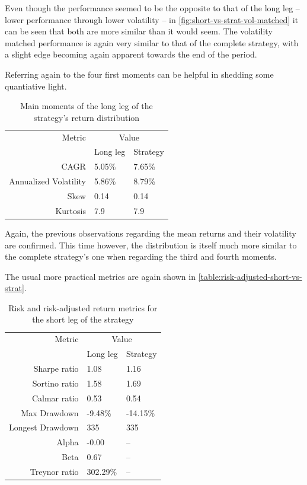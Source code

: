 Even though the performance seemed to be the opposite to that of the long leg -- lower performance through lower volatility -- in \autoref{fig:short-vs-strat-vol-matched} it can be seen that both are more similar than it would seem. The volatility matched performance is again very similar to that of the complete strategy, with a slight edge becoming again apparent towards the end of the period.

Referring again to the four first moments can be helpful in shedding some quantiative light.

\begin{table}[ht]
    \centering
    \begin{tabular}{rll}
        \toprule
        Metric & \multicolumn{2}{c}{Value} \\ 
        \cmidrule(lr){2-3}
            & Long leg & Strategy \\
        \midrule
        CAGR & 5.05\% & 7.65\% \\
        Annualized Volatility & 5.86\% & 8.79\% \\
        Skew & 0.14 & 0.14 \\
        Kurtosis & 7.9 & 7.9 \\
        \bottomrule
    \end{tabular}
    \caption{Main moments of the long leg of the strategy's return distribution}
    \label{table:main-moments-short-vs-strat}
\end{table}

Again, the previous observations regarding the mean returns and their volatility are confirmed. This time however, the distribution is itself much more similar to the complete strategy's one when regarding the third and fourth moments. 

The usual more practical metrics are again shown in \autoref{table:risk-adjusted-short-vs-strat}.
\newpage
\begin{table}[ht]
    \centering
    \begin{tabular}{rll}
        \toprule
        Metric & \multicolumn{2}{c}{Value} \\ 
        \cmidrule(lr){2-3}
            & Long leg & Strategy \\
        \midrule
        Sharpe ratio & 1.08 & 1.16 \\
        Sortino ratio & 1.58 & 1.69 \\
        Calmar ratio & 0.53 & 0.54 \\
        Max Drawdown & -9.48\% & -14.15\% \\
        Longest Drawdown & 335 & 335 \\
        Alpha & -0.00 & -- \\
        Beta & 0.67 & -- \\
        Treynor ratio & 302.29\% & -- \\
        \bottomrule
    \end{tabular}
    \caption{Risk and risk-adjusted return metrics for the short leg of the strategy}
    \label{table:risk-adjusted-short-vs-strat}
\end{table}

